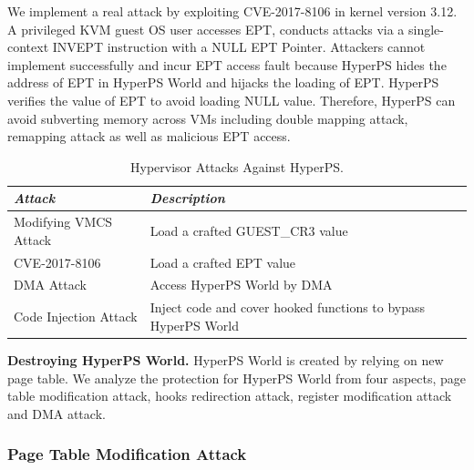 \documentclass[conference]{IEEEtran}
\begin{document}
We implement a real attack by exploiting CVE-2017-8106 in kernel version 3.12. A privileged KVM guest OS user accesses EPT, conducts attacks via a single-context INVEPT instruction with a NULL EPT Pointer. Attackers cannot implement successfully and incur EPT access fault because HyperPS hides the address of EPT in HyperPS World and hijacks the loading of EPT. HyperPS verifies the value of EPT to avoid loading NULL value. Therefore, HyperPS can avoid subverting memory across VMs including double mapping attack, remapping attack as well as malicious EPT access.


\begin{table}
\centering
\caption{Hypervisor Attacks Against HyperPS.}\label{tab3}
\begin{tabular}{p{2.8cm}|p{5.5cm}}
\hline
{\itshape\bfseries Attack} & {\itshape\bfseries Description} \\
\hline
Modifying VMCS Attack & Load a crafted GUEST\_CR3 value\\
\hline
CVE-2017-8106 & Load a crafted EPT value \\
\hline
DMA Attack & Access HyperPS World by DMA \\
\hline
Code Injection Attack & Inject code and cover hooked functions to bypass HyperPS World \\
\hline
\end{tabular}
\end{table}

\textbf{Destroying HyperPS World.}
HyperPS World is created by relying on new page table.
We analyze the protection for HyperPS World from four aspects, page table modification attack, hooks redirection attack, register modification attack and DMA attack.


\subsubsection{Page Table Modification Attack}
\end{document}
